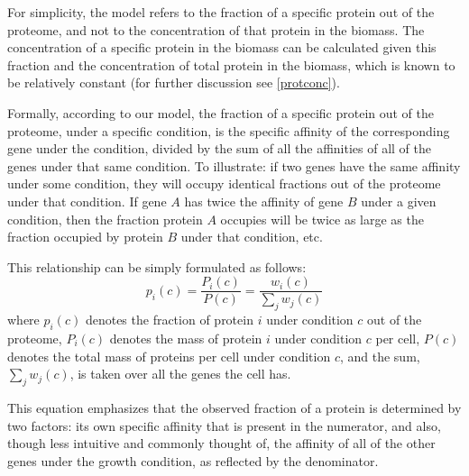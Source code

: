 For simplicity, the model refers to the fraction of a specific protein out of the proteome, and not to the concentration of that protein in the biomass.
The concentration of a specific protein in the biomass can be calculated given this fraction and the concentration of total protein in the biomass, which is known to be relatively constant \cite{Bremer1987,Scott2014} (for further discussion see \ref{protconc}).

Formally, according to our model, the fraction of a specific protein out of the proteome, under a specific condition, is the specific affinity of the corresponding gene under the condition, divided by the sum of all the affinities of all of the genes under that same condition.
To illustrate: if two genes have the same affinity under some condition, they will occupy identical fractions out of the proteome under that condition.
If gene $A$ has twice the affinity of gene $B$ under a given condition, then the fraction protein  $A$ occupies will be twice as large as the fraction occupied by protein $B$ under that condition, etc.

This relationship can be simply formulated as follows:
\begin{equation}
  \label{eq:concentration-ratio}
  p_i(c)=\frac{P_i(c)}{P(c)}=\frac{w_i(c)}{\sum_jw_j(c)}
\end{equation}
where $p_i(c)$ denotes the fraction of protein $i$ under condition $c$ out of the proteome, $P_i(c)$ denotes the mass of protein $i$ under condition $c$ per cell, $P(c)$ denotes the total mass of proteins per cell under condition $c$, and the sum, $\sum_jw_j(c)$, is taken over all the genes the cell has.

This equation emphasizes that the observed fraction of a protein is determined by two factors: its own specific affinity that is present in the numerator, and also, though less intuitive and commonly thought of, the affinity of all of the other genes under the growth condition, as reflected by the denominator.
